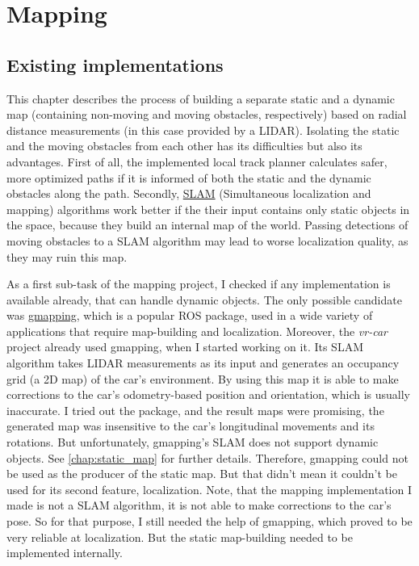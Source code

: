 \chapter{Mapping}
\label{chap:mapping}

\section{Existing implementations}
This chapter describes the process of building a separate static and a dynamic map (containing non-moving and moving obstacles, respectively) based on radial distance measurements (in this case provided by a LIDAR). Isolating the static and the moving obstacles from each other has its difficulties but also its advantages. First of all, the implemented local track planner calculates safer, more optimized paths if it is informed of both the static and the dynamic obstacles along the path. Secondly, \href{https://en.wikipedia.org/wiki/Simultaneous_localization_and_mapping}{SLAM} (Simultaneous localization and mapping) algorithms work better if the their input contains only static objects in the space, because they build an internal map of the world. Passing detections of moving obstacles to a SLAM algorithm may lead to worse localization quality, as they may ruin this map.

As a first sub-task of the mapping project, I checked if any implementation is available already, that can handle dynamic objects. The only possible candidate was \href{http://wiki.ros.org/gmapping}{gmapping}, which is a popular ROS package, used in a wide variety of applications that require map-building and localization. Moreover, the \textit{vr-car} project already used gmapping, when I started working on it. Its SLAM algorithm takes LIDAR measurements as its input and generates an occupancy grid (a 2D map) of the car's environment. By using this map it is able to make corrections to the car's odometry-based position and orientation, which is usually inaccurate. I tried out the package, and the result maps were promising, the generated map was insensitive to the car's longitudinal movements and its rotations. But unfortunately, gmapping's SLAM does not support dynamic objects. See \ref{chap:static_map} for further details. Therefore, gmapping could not be used as the producer of the static map. But that didn't mean it couldn't be used for its second feature, localization. Note, that the mapping implementation I made is not a SLAM algorithm, it is not able to make corrections to the car's pose. So for that purpose, I still needed the help of gmapping, which proved to be very reliable at localization. But the static map-building needed to be implemented internally.

